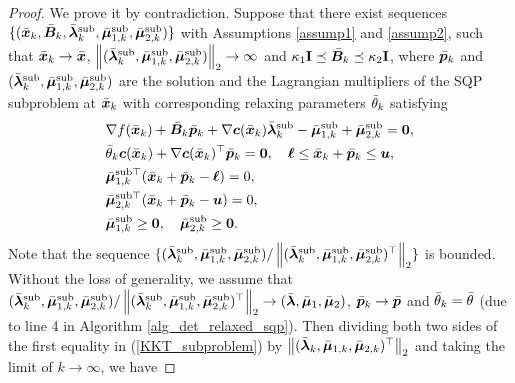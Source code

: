 \documentclass[aos]{imsart}
\numberwithin{equation}{section}
\theoremstyle{plain}
\begin{document}
\begin{appendix}
\begin{proof}
    We prove it by contradiction. Suppose that there exist sequences $\{(\Bar{\bm{x}}_k, \Bar{\bm{B}}_k, \Bar{\bm{\lambda}}_{k}^{\text{sub}}, \Bar{\bm{\mu}}_{1,k}^{\text{sub}}, \Bar{\bm{\mu}}_{2,k}^{\text{sub}})\}$ with Assumptions \ref{assump1} and \ref{assump2}, such that 
    $\Bar{\bm{x}}_k \to \Bar{\bm{x}}$, $\left\| (\Bar{\bm{\lambda}}_{k}^{\text{sub}}, \Bar{\bm{\mu}}_{1,k}^{\text{sub}}, \Bar{\bm{\mu}}_{2,k}^{\text{sub}})\right\|_2 \to \infty$ and $\kappa_1 \mathbf{I} \preceq \Bar{\bm{B}}_k \preceq \kappa_2 \mathbf{I}$, where $\Bar{\bm{p}}_k$ and $(\Bar{\bm{\lambda}}_{k}^{\text{sub}}, \Bar{\bm{\mu}}_{1,k}^{\text{sub}}, \Bar{\bm{\mu}}_{2,k}^{\text{sub}})$ are the solution and the Lagrangian multipliers of the SQP subproblem at $\Bar{\bm{x}}_k$ with corresponding relaxing parameters $\Bar{\theta}_k$ satisfying
    \begin{equation}
    \label{KKT_subproblem}
        \begin{split}
            & \nabla f (\Bar{\bm{x}}_k) + \Bar{\bm{B}}_k \Bar{\bm{p}}_k+ \nabla \bm{c}(\Bar{\bm{x}}_k) \Bar{\bm{\lambda}}_{k}^{\text{sub}} - \Bar{\bm{\mu}}_{1,k}^{\text{sub}} + \Bar{\bm{\mu}}_{2,k}^{\text{sub}} = \bm{0},\\
            & \Bar{\theta}_k \bm{c}(\Bar{\bm{x}}_k) + \nabla \bm{c}(\Bar{\bm{x}}_k)^{\top} \Bar{\bm{p}}_k = \bm{0},\quad \bm{\ell} \leq \Bar{\bm{x}}_k + \Bar{\bm{p}}_k \leq \bm{u},\\
            & \Bar{\bm{\mu}}_{1,k}^{\text{sub} \top} (\Bar{\bm{x}}_k + \Bar{\bm{p}}_k - \bm{\ell}) = 0,\\
            & \Bar{\bm{\mu}}_{2,k}^{\text{sub}\top}(\Bar{\bm{x}}_k + \Bar{\bm{p}}_k - \bm{u}) = 0,\\
            & \Bar{\bm{\mu}}_{1,k}^{\text{sub}} \geq \bm{0}, \quad \Bar{\bm{\mu}}_{2,k}^{\text{sub}} \geq \bm{0}.
        \end{split}
    \end{equation}
    Note that the sequence $\{(\Bar{\bm{\lambda}}_{k}^{\text{sub}}, \Bar{\bm{\mu}}_{1,k}^{\text{sub}}, \Bar{\bm{\mu}}_{2,k}^{\text{sub}}) / \left\| (\Bar{\bm{\lambda}}_{k}^{\text{sub}}, \Bar{\bm{\mu}}_{1,k}^{\text{sub}}, \Bar{\bm{\mu}}_{2,k}^{\text{sub}})^{\top}\right\|_2\}$ is bounded. Without the loss of generality, we assume that $(\Bar{\bm{\lambda}}_{k}^{\text{sub}}, \Bar{\bm{\mu}}_{1,k}^{\text{sub}}, \Bar{\bm{\mu}}_{2,k}^{\text{sub}}) / \left\| (\Bar{\bm{\lambda}}_{k}^{\text{sub}}, \Bar{\bm{\mu}}_{1,k}^{\text{sub}}, \Bar{\bm{\mu}}_{2,k}^{\text{sub}})^{\top}\right\|_2 \to (\Bar{\bm{\lambda}}, \Bar{\bm{\mu}}_{1}, \Bar{\bm{\mu}}_{2})$, $\Bar{\bm{p}}_k \to \Bar{\bm{p}}$ and $\Bar{\theta}_k = \Bar{\theta}$ (due to line 4 in Algorithm \ref{alg_det_relaxed_sqp}). Then dividing both two sides of the first equality in  (\ref{KKT_subproblem}) by $\left\| (\Bar{\bm{\lambda}}_{k}, \Bar{\bm{\mu}}_{1,k}, \Bar{\bm{\mu}}_{2,k})^{\top}\right\|_2$ and taking the limit of $k \to \infty$, we have 

\end{proof}
\end{appendix}
\end{document}
